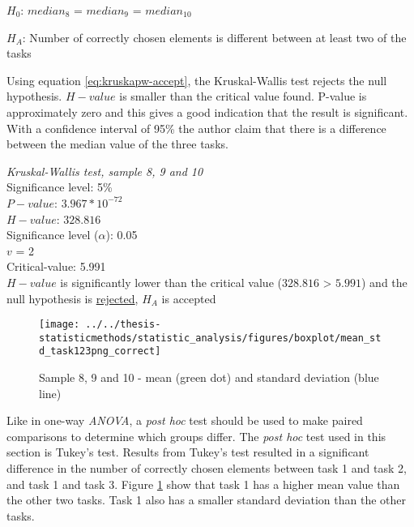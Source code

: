 \centerline{$H_{0}$: $median_8$ = $median_9$ = $median_10$}
\centerline{$H_{A}$: Number of correctly chosen elements is different between at least two of the tasks}

Using equation \ref{eq:kruskapw-accept}, the Kruskal-Wallis test rejects the null hypothesis. $H-value$ is smaller than the critical value found. P-value is approximately zero and this gives a good indication that the result is significant. With a confidence interval of 95\% the author claim that there is a difference between the median value of the three tasks. \\[0.2cm]

 \begin{center}
	\begin{tcolorbox}[width=0.8\textwidth]
		\centering
		\textit{Kruskal-Wallis test, sample 8, 9 and 10}\\
		Significance level: 5\%  \\[0.5cm]
		
		$P-value$: $3.967* 10^{-72}$ \\
		$H-value$: $328.816$ \\
		Significance level ($\alpha$): 0.05 \\
		$v$ = 2\\ %
		Critical-value:  5.991\\[0.2cm] %
		
		$H-value$ is significantly lower than the critical value ($328.816$ > $5.991$) and the null hypothesis is \underline{rejected}, $H_A$ is accepted\\[0.5cm]
	\end{tcolorbox} 
\end{center}

\begin{figure}[h!]
	\centering
	\texttt{[image: ../../thesis-statisticmethods/statistic\_analysis/figures/boxplot/mean\_std\_task123png\_correct]}
	\caption{Sample 8, 9 and 10 - mean (green dot) and standard deviation (blue line)}
	\label{fig:meanstdtask123pngcorrect}
\end{figure}

Like in one-way \textit{ANOVA}, a \textit{post hoc} test should be used to make paired comparisons to determine which groups differ. The \textit{post hoc} test used in this section is Tukey's test. Results from Tukey's test resulted in a significant difference in the number of correctly chosen elements between task 1 and task 2, and task 1 and task 3. Figure \ref{fig:meanstdtask123pngcorrect} show that task 1 has a higher mean value than the other two tasks. Task 1 also has a smaller standard deviation than the other tasks. \\[0.2cm]

